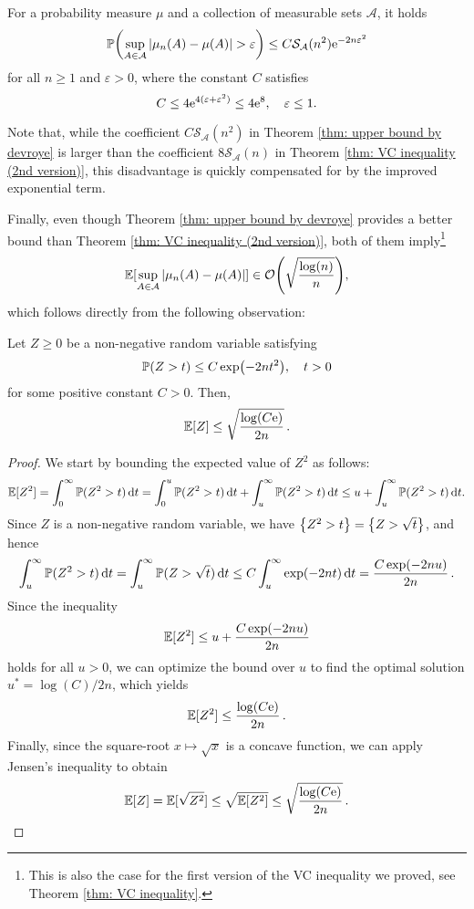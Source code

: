 \begin{theorem}[Devroye, 1982]
\label{thm: upper bound by devroye}
For a probability measure $\mu$ and a collection of measurable sets $\mathcal{A}$, it holds
\[
    \Prob\left(\sup_{A \in \mathcal{A}} \abs{\mu_n(A) - \mu(A)} > \varepsilon\right) \leq C \mathcal{S}_{\mathcal{A}}(n^2) \e^{-2n \varepsilon^2}
\]
for all $n \geq 1$ and $\varepsilon > 0$, where the constant $C$ satisfies
\[
    C \leq 4 \mathrm{e}^{4(\varepsilon + \varepsilon^2)} \leq 4 \mathrm{e}^8, \quad \varepsilon \leq 1.
\]
\end{theorem}

Note that, while the coefficient $C \mathcal{S}_{\mathcal{A}}(n^2)$ in Theorem \ref{thm: upper bound by devroye} is larger than the coefficient $8 \mathcal{S}_{\mathcal{A}}(n)$ in Theorem \ref{thm: VC inequality (2nd version)}, this disadvantage is quickly compensated for by the improved exponential term.

Finally, even though Theorem \ref{thm: upper bound by devroye} provides a better bound than Theorem \ref{thm: VC inequality (2nd version)}, both of them imply\footnote{This is also the case for the first version of the VC inequality we proved, see Theorem \ref{thm: VC inequality}.}
\[
    \Exp[\sup_{A \in \mathcal{A}} \abs{\mu_n(A) - \mu(A)}] \in \mathcal{O}\left(\sqrt{\frac{\log(n)}{n}}\right),
\]
which follows directly from the following observation:

\begin{proposition}
Let $Z \geq 0$ be a non-negative random variable satisfying
\[
    \operatorname{\mathbb{P}}(Z > t) \leq C \exp(-2nt^2), \quad t > 0
\]
for some positive constant $C > 0$. Then,
\[
    \operatorname{\mathbb{E}}[Z] \leq \sqrt{\frac{\log(C\mathrm{e})}{2n}} \, .
\]
\end{proposition}

\begin{proof}
We start by bounding the expected value of $Z^2$ as follows:
\[
    \operatorname{\mathbb{E}}[Z^2] = \int_0^{\infty} \operatorname{\mathbb{P}}(Z^2 > t) \, \mathrm{d}t = \int_0^u \operatorname{\mathbb{P}}(Z^2 > t) \, \mathrm{d}t + \int_u^{\infty} \operatorname{\mathbb{P}}(Z^2 > t) \, \mathrm{d}t \leq u + \int_u^{\infty} \operatorname{\mathbb{P}}(Z^2 > t) \, \mathrm{d}t.
\]
Since $Z$ is a non-negative random variable, we have $\set{Z^2 > t} = \set{Z > \sqrt{t}}$, and hence
\[
    \int_u^{\infty} \operatorname{\mathbb{P}}(Z^2 > t) \, \mathrm{d}t = \int_u^{\infty} \operatorname{\mathbb{P}}(Z > \sqrt{t}) \, \mathrm{d}t \leq C \int_u^{\infty} \exp(-2nt) \, \mathrm{d}t = \frac{C \exp(-2nu)}{2n} \, .
\]
Since the inequality
\[
    \operatorname{\mathbb{E}}[Z^2] \leq u + \frac{C \exp(-2nu)}{2n}
\]
holds for all $u > 0$, we can optimize the bound over $u$ to find the optimal solution $u^* = \log(C) / 2n$, which yields
\[
    \operatorname{\mathbb{E}}[Z^2] \leq \frac{\log(C\mathrm{e})}{2n} \, .
\]
Finally, since the square-root $x \mapsto \sqrt{x}$ is a concave function, we can apply Jensen's inequality to obtain
\[
    \operatorname{\mathbb{E}}[Z] = \operatorname{\mathbb{E}}[\sqrt{Z^2}] \leq \sqrt{\operatorname{\mathbb{E}}[Z^2]} \leq \sqrt{\frac{\log(C\mathrm{e})}{2n}} \, . \qedhere
\]
\end{proof}

